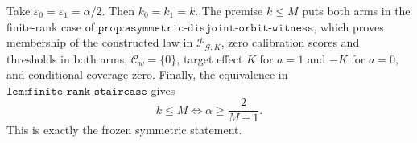 Take \(\varepsilon_0=\varepsilon_1=\alpha/2\). Then \(k_0=k_1=k\). The premise \(k\le M\) puts both arms in the finite-rank case of \(\texttt{prop:asymmetric-disjoint-orbit-witness}\), which proves membership of the constructed law in \(\mathcal P_{\mathcal G,K}\), zero calibration scores and thresholds in both arms, \(\mathcal C_w=\{0\}\), target effect \(K\) for \(a=1\) and \(-K\) for \(a=0\), and conditional coverage zero. Finally, the equivalence in \(\texttt{lem:finite-rank-staircase}\) gives
\[
k\le M\iff \alpha\ge\frac{2}{M+1}.
\]
This is exactly the frozen symmetric statement.